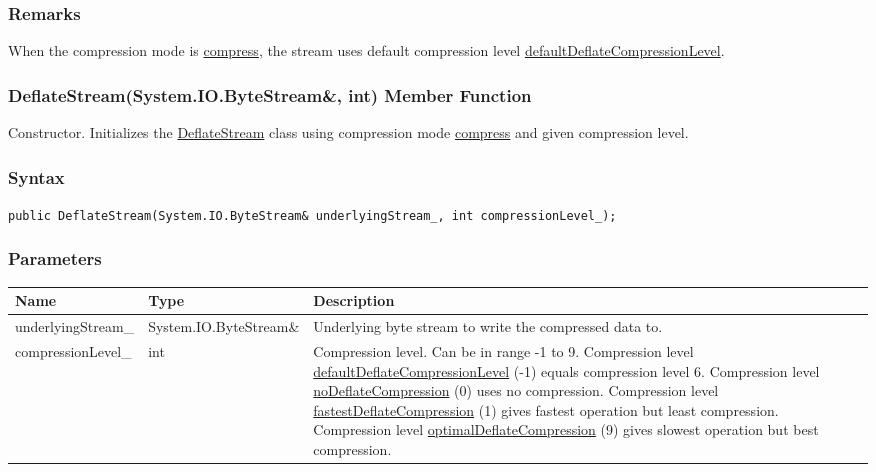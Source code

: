 \documentclass[a4paper,oneside,11.000000pt]{book}
\begin{document}
\subsubsection*{Remarks}
\begin{flushleft}
When the compression mode is \hyperlink{System.IO.Compression.CompressionMode.compress}{compress}, the stream uses default compression level \hyperlink{System.IO.Compression.defaultDeflateCompressionLevel}{defaultDeflateCompressionLevel}.

\end{flushleft}
\clearpage

\hypertarget{System.IO.Compression.DeflateStream.constructor.P.System.IO.Compression.DeflateStream.R.System.IO.ByteStream.int}{\subsubsection*{DeflateStream(System.IO.ByteStream\&, int) Member Function}}
\begin{flushleft}
Constructor. Initializes the \hyperlink{System.IO.Compression.DeflateStream}{DeflateStream} class using compression mode \hyperlink{System.IO.Compression.CompressionMode.compress}{compress} and given compression level.

\end{flushleft}
\subsubsection*{Syntax}
\texttt{public DeflateStream(System.IO.ByteStream\& underlyingStream\_, int compressionLevel\_);}
\subsubsection*{Parameters}
\begin{flushleft}
\begin{supertabular}[l]{!{\raggedright}p{4.10323cm}!{\raggedright}p{5.76344cm}!{\raggedright}p{4.93333cm}}
\textbf{Name}
& \textbf{Type}
& \textbf{Description}
\\
\hline
underlyingStream\_
& System.\-IO.\-ByteStream\&\-
& Underlying byte stream to write the compressed data to.

\\
compressionLevel\_
& int
& Compression level. Can be in range -1 to 9.
Compression level \hyperlink{System.IO.Compression.defaultDeflateCompressionLevel}{defaultDeflateCompressionLevel} (-1) equals compression level 6.
Compression level \hyperlink{System.IO.Compression.noDeflateCompression}{noDeflateCompression} (0) uses no compression.
Compression level \hyperlink{System.IO.Compression.fastestDeflateCompression}{fastestDeflateCompression} (1) gives fastest operation but least compression.
Compression level \hyperlink{System.IO.Compression.optimalDeflateCompression}{optimalDeflateCompression} (9) gives slowest operation but best compression.

\\
\end{supertabular}

\end{flushleft}
\end{document}
